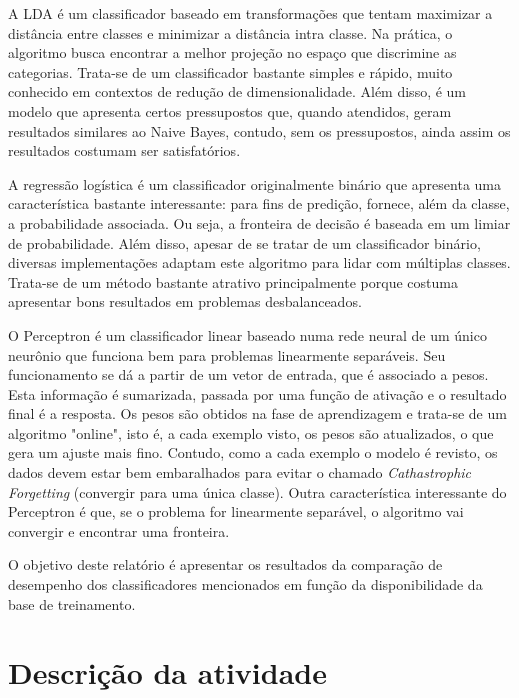 \documentclass[
	12pt,				%
	openright,			%
	twoside,			%
	a4paper,			%
	english,			%
	brazil,				%
	svgnames
	]{abntex2}\usepackage[]{graphicx}\usepackage[]{color}
\begin{document}
A LDA é um classificador baseado em transformações que tentam maximizar a distância entre classes e minimizar a distância intra classe. Na prática, o algoritmo busca encontrar a melhor projeção no espaço que discrimine as categorias. Trata-se de um classificador bastante simples e rápido, muito conhecido em contextos de redução de dimensionalidade. Além disso, é um modelo que apresenta certos pressupostos que, quando atendidos, geram resultados similares ao Naive Bayes, contudo, sem os pressupostos, ainda assim os resultados costumam ser satisfatórios.

A regressão logística é um classificador originalmente binário que apresenta uma característica bastante interessante: para fins de predição, fornece, além da classe, a probabilidade associada. Ou seja, a fronteira de decisão é baseada em um limiar de probabilidade. Além disso, apesar de se tratar de um classificador binário, diversas implementações adaptam este algoritmo para lidar com múltiplas classes. Trata-se de um método bastante atrativo principalmente porque costuma apresentar bons resultados em problemas desbalanceados.

O Perceptron é um classificador linear baseado numa rede neural de um único neurônio que funciona bem para problemas linearmente separáveis. Seu funcionamento se dá a partir de um vetor de entrada, que é associado a pesos. Esta informação é sumarizada, passada por uma função de ativação e o resultado final é a resposta. Os pesos são obtidos na fase de aprendizagem e trata-se de um algoritmo "online", isto é, a cada exemplo visto, os pesos são atualizados, o que gera um ajuste mais fino. Contudo, como a cada exemplo o modelo é revisto, os dados devem estar bem embaralhados para evitar o chamado \emph{Cathastrophic Forgetting} (convergir para uma única classe). Outra característica interessante do Perceptron é que, se o problema for linearmente separável, o algoritmo vai convergir e encontrar uma fronteira.

O objetivo deste relatório é apresentar os resultados da comparação de desempenho dos classificadores mencionados em função da disponibilidade da base de treinamento.


\chapter{Descrição da atividade}
\label{cap:descricao}

\end{document}
